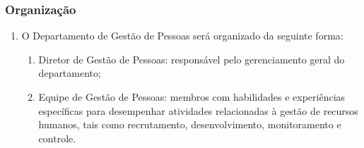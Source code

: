         \subsubsection{Organização}
        \begin{enumerate}
            \item O Departamento de Gestão de Pessoas será organizado da seguinte forma:
                \begin{enumerate}
                    \item Diretor de Gestão de Pessoas: responsável pelo gerenciamento geral do departamento;
                    \item Equipe de Gestão de Pessoas: membros com habilidades e experiências específicas para desempenhar atividades relacionadas à gestão de recursos humanos, tais como recrutamento, desenvolvimento, monitoramento e controle.
                \end{enumerate}
        \end{enumerate}
